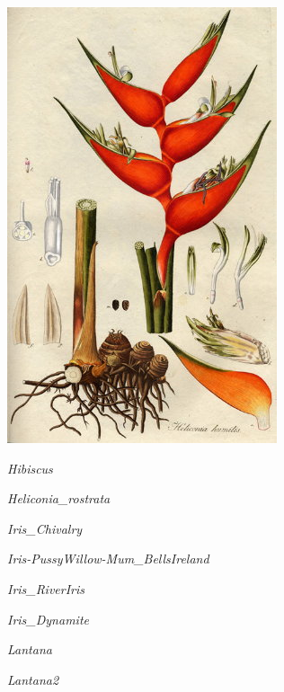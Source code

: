 \documentclass{article}
\begin{document}
\begin{center}
\includegraphics[height=0.9\textheight, angle=90]{../Heliconia_humilisJacquin.jpg}
\end{center}
\newpage

\noindent
\vfill
\centerline{{\Large\emph{Hibiscus}}}
\vfill
\newpage

\noindent
\vfill
\centerline{{\Large\emph{Heliconia_rostrata}}}
\vfill
\newpage

\noindent
\vfill
\centerline{{\Large\emph{Iris_Chivalry}}}
\vfill
\newpage

\noindent
\vfill
\centerline{{\Large\emph{Iris-PussyWillow-Mum_BellsIreland}}}
\vfill
\newpage

\noindent
\vfill
\centerline{{\Large\emph{Iris_RiverIris}}}
\vfill
\newpage

\noindent
\vfill
\centerline{{\Large\emph{Iris_Dynamite}}}
\vfill
\newpage

\noindent
\vfill
\centerline{{\Large\emph{Lantana}}}
\vfill
\newpage

\noindent
\vfill
\centerline{{\Large\emph{Lantana2}}}
\vfill
\newpage
\end{document}
